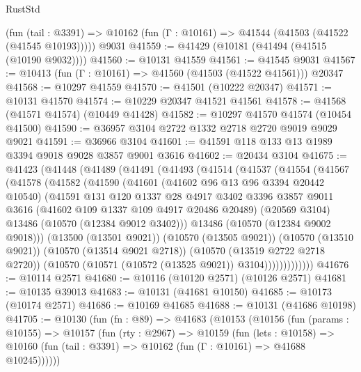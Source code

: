 \begin{lexlean}{RustStd}
\begin{coremodule}
    (fun (tail : @3391) => @10162 (fun (Γ : @10161) => @41544 (@41503 (@41522 (@41545 @10193)))))
    @9031
@41559 := @41429 (@10181 (@41494 (@41515 (@10190 @9032))))
@41560 := @10131 @41559
@41561 := @41545 @9031
@41567 := @10413 (fun (Γ : @10161) => @41560 (@41503 (@41522 @41561))) @20347
@41568 := @10297 @41559
@41570 := @41501 (@10222 @20347)
@41571 := @10131 @41570
@41574 := @10229 @20347 @41521 @41561
@41578 := @41568 (@41571 @41574) (@10449 @41428)
@41582 := @10297 @41570 @41574 (@10454 @41500)
@41590 := @36957 @3104 @2722 @1332 @2718 @2720 @9019 @9029 @9021
@41591 := @36966 @3104
@41601 := @41591 @118 @133 @13 @1989 @3394 @9018 @9028 @3857 @9001 @3616
@41602 := @20434 @3104
@41675 := @41423
    (@41448
      (@41489
        (@41491
          (@41493
            (@41514
              (@41537
                (@41554
                  (@41567
                    (@41578
                      (@41582
                        (@41590
                          (@41601
                            (@41602 @96 @13 @96 @3394 @20442 @10540)
                            (@41591
                              @131
                              @120
                              @1337
                              @28
                              @4917
                              @3402
                              @3396
                              @3857
                              @9011
                              @3616
                              (@41602 @109 @1337 @109 @4917 @20486 @20489)
                              (@20569 @3104)
                              @13486
                              (@10570 (@12384 @9012 @3402)))
                            @13486
                            (@10570 (@12384 @9002 @9018)))
                          (@13500 (@13501 @9021))
                          (@10570 (@13505 @9021))
                          (@10570 (@13510 @9021))
                          (@10570 (@13514 @9021 @2718))
                          (@10570 (@13519 @2722 @2718 @2720))
                          (@10570 (@10571 (@10572 (@13525 @9021)) @3104)))))))))))))
@41676 := @10114 @2571
@41680 := @10116 (@10120 @2571) (@10126 @2571)
@41681 := @10135 @39013
@41683 := @10131 (@41681 @10150)
@41685 := @10173 (@10174 @2571)
@41686 := @10169 @41685
@41688 := @10131 (@41686 @10198)
@41705 := @10130
    (fun (fn : @89) =>
    @41683
      (@10153
        (@10156
          (fun (params : @10155) =>
          @10157
            (fun (rty : @2967) =>
            @10159
              (fun (lets : @10158) =>
              @10160 (fun (tail : @3391) => @10162 (fun (Γ : @10161) => @41688 @10245))))))

\end{coremodule}
\end{lexlean}
